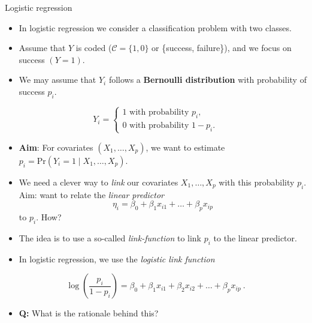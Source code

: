 \documentclass[
  10pt,
  ignorenonframetext,
]{beamer}
\providecommand{\tightlist}{%
  \setlength{\itemsep}{0pt}\setlength{\parskip}{0pt}}
\begin{document}
\begin{frame}{Logistic regression}
\protect\hypertarget{logistic-regression}{}
\begin{itemize}
\item
  In logistic regression we consider a classification problem with two
  classes.
\item
  Assume that \(Y\) is coded (\(\mathcal{C} = \{1, 0\}\) or \{success,
  failure\}), and we focus on success \((Y=1)\).
\item
  We may assume that \(Y_i\) follows a \textbf{Bernoulli distribution}
  with probability of success \(p_i\).
\end{itemize}

\[Y_i = \begin{cases} 1 \text{ with probability } p_i, \\ 0 \text{ with probability } 1-p_i. \end{cases}\]

\begin{itemize}
\tightlist
\item
  \textbf{Aim}: For covariates \((X_1,\ldots,X_p)\), we want to estimate
  \(p_i = \text{Pr}(Y_i=1 \mid X_1,\ldots,X_p)\).
\end{itemize}
\end{frame}

\begin{frame}
\begin{itemize}
\item
  We need a clever way to \emph{link} our covariates
  \(X_1, \ldots, X_p\) with this probability \(p_i\). Aim: want to
  relate the \emph{linear predictor}
  \[\eta_i = \beta_0 + \beta_1 x_{i1} + \ldots + \beta_p x_{ip}\] to
  \(p_i\). How?
\item
  The idea is to use a so-called \emph{link-function} to link \(p_i\) to
  the linear predictor.
\item
  In logistic regression, we use the \emph{logistic link function}
\end{itemize}

\begin{equation}
\log\left( \frac{p_i}{1-p_i} \right) = \beta_0 + \beta_1 x_{i1} + \beta_2 x_{i2} + \ldots + \beta_p x_{ip} \ .
\end{equation}

\begin{itemize}
\tightlist
\item
  \textbf{Q:} What is the rationale behind this?
\end{itemize}
\end{frame}
\end{document}
